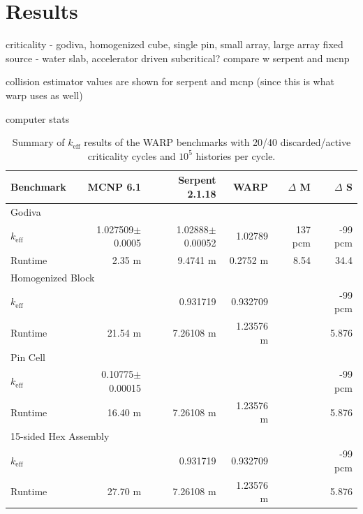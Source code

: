 \chapter{Results}
\label{chap:results}


criticality - godiva, homogenized cube, single pin,  small array, large array
fixed source - water slab, accelerator driven subcritical?
compare w serpent and mcnp

collision estimator values are shown for serpent and mcnp (since this is what warp uses as well)

computer stats

\begin{table}[h]
\centering
\caption{Summary of $k_\mathrm{eff}$ results of the WARP benchmarks with 20/40 discarded/active criticality cycles and $10^5$ histories per cycle.}
\label{benchmark_summary}
\begin{tabular}{| l | r | r | r | r | r |}
 \hline
 Benchmark & MCNP 6.1 & Serpent 2.1.18 & WARP & $\Delta$ M & $\Delta$ S  \\
\hline
\hline
\multicolumn{6}{|l|}{Godiva}  \\
\hline
 $k_\mathrm{eff}$ & 1.027509$\pm$0.0005 & 1.02888$\pm$0.00052 & 1.02789 & 137 pcm & -99 pcm  \\
 \hline
 Runtime               & 2.35 m & 9.4741 m & 0.2752 m & 8.54  & 34.4  \\
 \hline
 \hline
\multicolumn{6}{|l|}{Homogenized Block }\\
\hline
 $k_\mathrm{eff}$ & & 0.931719 & 0.932709 & & -99 pcm   \\
 \hline
 Runtime               & 21.54 m & 7.26108 m & 1.23576 m & & 5.876 \\
 \hline
  \hline
\multicolumn{6}{|l|}{Pin Cell}\\
\hline
 $k_\mathrm{eff}$ & 0.10775$\pm$0.00015 &  &  & & -99 pcm    \\
 \hline
 Runtime               & 16.40 m & 7.26108 m & 1.23576 m & & 5.876  \\
 \hline
  \hline
\multicolumn{6}{|l|}{15-sided Hex Assembly}\\
\hline
 $k_\mathrm{eff}$ & & 0.931719 & 0.932709 & & -99 pcm  \\
 \hline
 Runtime               & 27.70 m & 7.26108 m & 1.23576 m  & & 5.876 \\
 \hline
\end{tabular}
\end{table}


